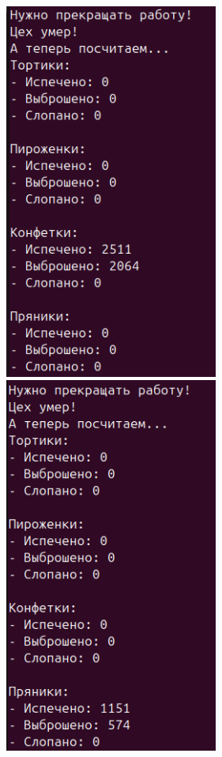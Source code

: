 \documentclass[a4paper,14pt]{extarticle}
\begin{document}
\includegraphics[width=70mm]{processes_output_2_3}
\includegraphics[width=70mm]{processes_output_2_4}
\end{document}
